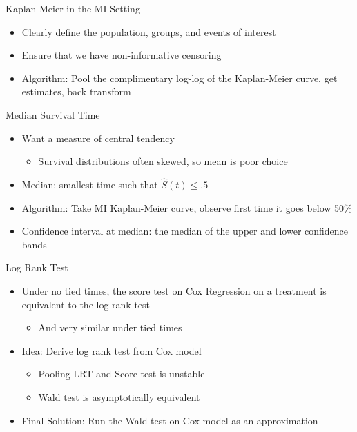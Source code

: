 \begin{frame}{Kaplan-Meier in the MI Setting}
 \begin{itemize}
  \item Clearly define the population, groups, and events of interest
  \item Ensure that we have non-informative censoring
\item Algorithm: Pool the complimentary log-log of the Kaplan-Meier curve, get estimates,
back transform \cite{Marshall2009}
 \end{itemize}

\end{frame}

\begin{frame}{Median Survival Time}
 \begin{itemize}
  \item Want a measure of central tendency
  \begin{itemize}
   \item Survival distributions often skewed, so mean is poor choice
  \end{itemize}
  \item Median: smallest time such that $\hat{S}(t)\leq .5$
\item Algorithm: Take MI Kaplan-Meier curve, observe first time it goes below 50\%
\item Confidence interval at median: the median of the upper and lower confidence bands
 \end{itemize}

\end{frame}

\begin{frame}{Log Rank Test}
 \begin{itemize}
 \item Under no tied times, the score test on
  Cox Regression on a treatment is equivalent to the
log rank test
\begin{itemize}
 \item And very similar under tied times
\end{itemize}
\item Idea: Derive log rank test from Cox model
\begin{itemize}
 \item Pooling LRT and Score test is unstable \cite{Marshall2009}
 \item Wald test is asymptotically equivalent
\end{itemize}
 \item Final Solution: Run the Wald test on Cox model as an approximation

 \end{itemize}
\end{frame}


